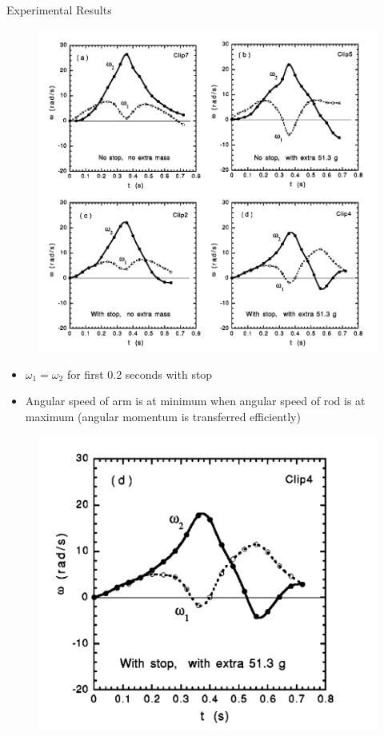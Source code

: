 \documentclass[tikz]{beamer}
\begin{document}
\begin{frame} {Experimental Results}
	\only<3> {
		\begin{figure}
			\centering
			\includegraphics[scale=0.25]{angularvelocities.png}
		\end{figure}
	}

	 {
		\begin{itemize}
			\item $\omega_1 = \omega_2$ for first 0.2 seconds with stop
			\item Angular speed of arm is at minimum when angular speed of rod is at maximum (angular momentum is transferred efficiently)
		\end{itemize}

		\begin{figure}
			\centering
			\includegraphics[scale=0.35]{angularvelocityrealistic.png}
		\end{figure}
	}


\end{frame}
\end{document}
